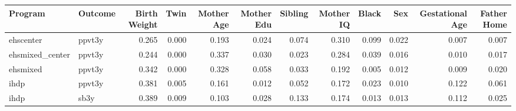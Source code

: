 \begin{table}[ht]
\centering
\begin{tabular}{llrrrrrrrrrr}
  \hline
Program & Outcome & Birth Weight & Twin & Mother Age & Mother Edu & Sibling & Mother IQ & Black & Sex & Gestational Age & Father Home \\ 
  \hline
ehscenter & ppvt3y & 0.265 & 0.000 & 0.193 & 0.024 & 0.074 & 0.310 & 0.099 & 0.022 & 0.007 & 0.007 \\ 
  ehsmixed\_center & ppvt3y & 0.244 & 0.000 & 0.337 & 0.030 & 0.023 & 0.284 & 0.039 & 0.016 & 0.010 & 0.017 \\ 
  ehsmixed & ppvt3y & 0.342 & 0.000 & 0.328 & 0.058 & 0.033 & 0.192 & 0.005 & 0.012 & 0.009 & 0.020 \\ 
  ihdp & ppvt3y & 0.381 & 0.005 & 0.161 & 0.012 & 0.052 & 0.172 & 0.023 & 0.010 & 0.122 & 0.061 \\ 
  ihdp & sb3y & 0.389 & 0.009 & 0.103 & 0.028 & 0.133 & 0.174 & 0.013 & 0.013 & 0.112 & 0.025 \\ 
   \hline
\end{tabular}
\end{table}
